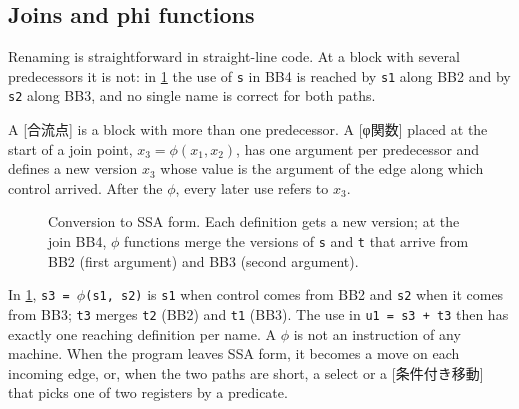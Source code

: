 \documentclass[../main.tex]{subfiles}
\begin{document}
\subsection{Joins and phi functions}

Renaming is straightforward in straight-line code.  At a block with
several predecessors it is not: in \cref{fig:l11-ssa} the use of
\texttt{s} in BB4 is reached by \texttt{s1} along BB2 and by
\texttt{s2} along BB3, and no single name is correct for both paths.

\begin{definition}
  \label{def:l11-phi}
  A [合流点] is a block with more than one predecessor.
  A [φ関数] placed at the start of a join point,
  $x_3 = \phi(x_1, x_2)$, has one argument per predecessor and defines
  a new version $x_3$ whose value is the argument of the edge along
  which control arrived.  After the $\phi$, every later use refers to
  $x_3$.
\end{definition}

\begin{figure}[tb]
  \centering
  
  \caption{Conversion to SSA form.  Each definition gets a new version;
    at the join BB4, $\phi$ functions merge the versions of \texttt{s}
    and \texttt{t} that arrive from BB2 (first argument) and BB3
    (second argument).}
  \label{fig:l11-ssa}
\end{figure}

In \cref{fig:l11-ssa}, \texttt{s3 = $\phi$(s1, s2)} is \texttt{s1} when
control comes from BB2 and \texttt{s2} when it comes from BB3;
\texttt{t3} merges \texttt{t2} (BB2) and \texttt{t1} (BB3).  The use in
\texttt{u1 = s3 + t3} then has exactly one reaching definition per
name.  A $\phi$ is not an instruction of any machine.  When the program
leaves SSA form, it becomes a move on each incoming edge, or, when the
two paths are short, a select or a [条件付き移動]
that picks one of two registers by a predicate.
\end{document}
